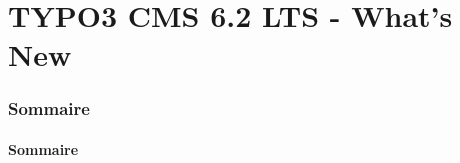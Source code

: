 \section*{TYPO3 CMS 6.2 LTS - What's New}
\begin{frame}[fragile]
	\frametitle{Sommaire}
	\framesubtitle{Sommaire}

	\begin{multicols}{2}
		\tableofcontents
	\end{multicols}

\end{frame}




















